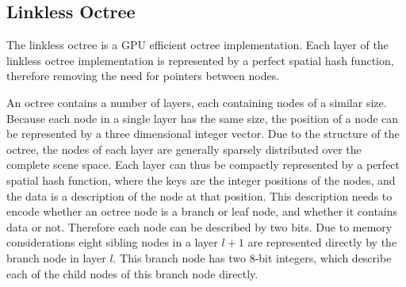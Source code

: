 



\subsection{Linkless Octree}

The linkless octree\cite{choi2009linkless} is a GPU efficient octree implementation. Each layer
of the linkless octree implementation is represented by a perfect spatial hash function,
therefore removing the need for pointers between nodes.

An octree contains a number of layers, each containing nodes of a similar size. Because each node
in a single layer has the same size, the position of a node can be represented by a three
dimensional integer vector. Due to the structure of the octree, the nodes of each layer
are generally sparsely distributed over the complete scene space. Each layer can thus be
compactly represented by a perfect spatial hash function, where the keys are the integer
positions of the nodes, and the data is a description of the node at that position.
This description needs to encode whether an octree node is a branch or leaf node, and
whether it contains data or not. Therefore each node can be described by two bits.
Due to memory considerations eight sibling nodes in a layer $l + 1$ are represented
directly by the branch node in layer $l$. This branch node has two 8-bit integers, which
describe each of the child nodes of this branch node directly.


